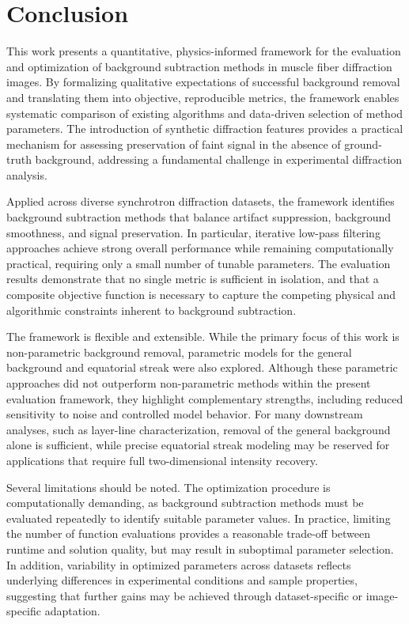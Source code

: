 \documentclass[iucr,review]{iucrjournals}
\begin{document}
\section{Conclusion}

This work presents a quantitative, physics-informed framework for the evaluation and optimization of background subtraction methods in muscle fiber diffraction images. By formalizing qualitative expectations of successful background removal and translating them into objective, reproducible metrics, the framework enables systematic comparison of existing algorithms and data-driven selection of method parameters. The introduction of synthetic diffraction features provides a practical mechanism for assessing preservation of faint signal in the absence of ground-truth background, addressing a fundamental challenge in experimental diffraction analysis.

Applied across diverse synchrotron diffraction datasets, the framework identifies background subtraction methods that balance artifact suppression, background smoothness, and signal preservation. In particular, iterative low-pass filtering approaches achieve strong overall performance while remaining computationally practical, requiring only a small number of tunable parameters. The evaluation results demonstrate that no single metric is sufficient in isolation, and that a composite objective function is necessary to capture the competing physical and algorithmic constraints inherent to background subtraction.

The framework is flexible and extensible. While the primary focus of this work is non-parametric background removal, parametric models for the general background and equatorial streak were also explored. Although these parametric approaches did not outperform non-parametric methods within the present evaluation framework, they highlight complementary strengths, including reduced sensitivity to noise and controlled model behavior. For many downstream analyses, such as layer-line characterization, removal of the general background alone is sufficient, while precise equatorial streak modeling may be reserved for applications that require full two-dimensional intensity recovery.

Several limitations should be noted. The optimization procedure is computationally demanding, as background subtraction methods must be evaluated repeatedly to identify suitable parameter values. In practice, limiting the number of function evaluations provides a reasonable trade-off between runtime and solution quality, but may result in suboptimal parameter selection. In addition, variability in optimized parameters across datasets reflects underlying differences in experimental conditions and sample properties, suggesting that further gains may be achieved through dataset-specific or image-specific adaptation.
\end{document}
